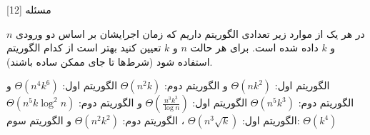 ‌مسئله [12]


% 
%
%
% 
در هر یک از موارد زیر تعدادی الگوریتم داریم که زمان اجرایشان بر اساس دو ورودی $n$ و $k$ داده شده است. برای هر حالت $n$ و $k$ تعیین کنید بهتر است از کدام الگوریتم استفاده شود (شرط‌ها تا جای ممکن ساده باشند).

الگوریتم اول:
$\Theta(nk^{2})$
و 
الگوریتم دوم:
$\Theta(n^{2}k)$
الگوریتم اول:
$\Theta(n^{4}k^{6})$
و 
الگوریتم دوم:
$\Theta(n^{5}k^{3})$
الگوریتم اول:
$\Theta(\frac{n^{3}k^{3}}{\log{n}})$
و 
الگوریتم دوم:
$\Theta(n^{5}k\log^{2}{n})$
الگوریتم اول:
$\Theta(n^{3}\sqrt{k})$
، 
الگوریتم دوم:
$\Theta(n^{2}k^{2})$
و 
الگوریتم سوم:
$\Theta(k^{4})$


